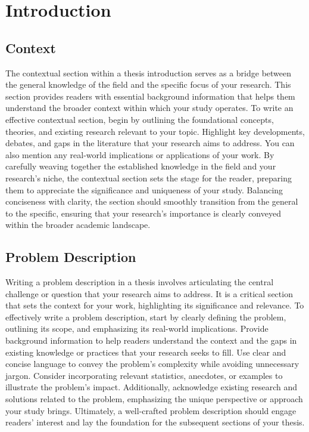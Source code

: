 \chapter{Introduction}\label{ch:intro1}

\section{Context}\label{sec:intro-context}

The contextual section within a thesis introduction serves as a bridge between the general knowledge of the field and the specific focus of your research. This section provides readers with essential background information that helps them understand the broader context within which your study operates. To write an effective contextual section, begin by outlining the foundational concepts, theories, and existing research relevant to your topic. Highlight key developments, debates, and gaps in the literature that your research aims to address. You can also mention any real-world implications or applications of your work. By carefully weaving together the established knowledge in the field and your research's niche, the contextual section sets the stage for the reader, preparing them to appreciate the significance and uniqueness of your study. Balancing conciseness with clarity, the section should smoothly transition from the general to the specific, ensuring that your research's importance is clearly conveyed within the broader academic landscape.

\section{Problem Description}\label{sec:intro-problem-description}
Writing a problem description in a thesis involves articulating the central challenge or question that your research aims to address. It is a critical section that sets the context for your work, highlighting its significance and relevance. To effectively write a problem description, start by clearly defining the problem, outlining its scope, and emphasizing its real-world implications. Provide background information to help readers understand the context and the gaps in existing knowledge or practices that your research seeks to fill. Use clear and concise language to convey the problem's complexity while avoiding unnecessary jargon. Consider incorporating relevant statistics, anecdotes, or examples to illustrate the problem's impact. Additionally, acknowledge existing research and solutions related to the problem, emphasizing the unique perspective or approach your study brings. Ultimately, a well-crafted problem description should engage readers' interest and lay the foundation for the subsequent sections of your thesis. \medskip

